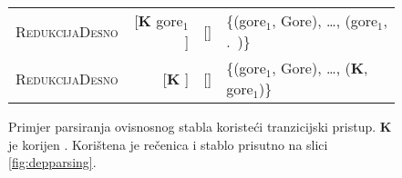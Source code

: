 \begin{figure}
\begin{tabular}{l|rlm{4cm}}
  \textsc{RedukcijaDesno}   & {[}\textbf{K} gore$_1$ {]}                          & {[}{]}                                                                      & \{(gore$_1$, Gore), \ldots, (gore$_1$, .~)\}  \\
  \textsc{RedukcijaDesno}   & {[}\textbf{K} {]}                                   & {[}{]}                                                                      & \{(gore$_1$, Gore), \ldots, (\textbf{K}, gore$_1$)\}  \\
  \end{tabular}
  \caption[Primjer parsiranja ovisnosnog stabla koristeći tranzicijski
  pristup.]{Primjer parsiranja ovisnosnog stabla koristeći tranzicijski pristup.
  \textbf{K} je korijen . Korištena je rečenica i stablo prisutno na
  slici \ref{fig:depparsing}.}
  \label{fig:shiftreduce}
\end{figure}
